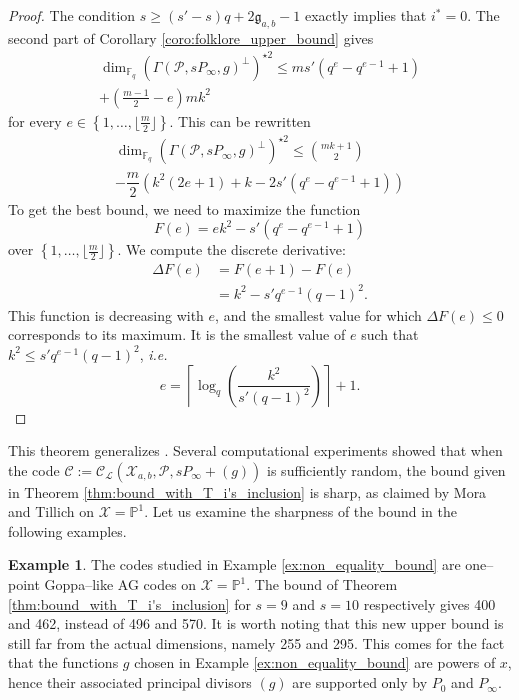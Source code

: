 \documentclass[journal]{IEEEtran}
\theoremstyle{plain}
\theoremstyle{definition}
\newtheorem{example}[thm]{Example}
\theoremstyle{remark}
\newcommand{\calP}{\mathcal{P}}
\newcommand{\calL}{\mathcal{L}}
\newcommand{\calC}{\mathcal{C}}
\newcommand{\calX}{\mathcal{X}}
\newcommand{\fq}{\mathbb{F}_{q}}
\newcommand{\PP}{\mathbb{P}}
\newcommand{\set}[1]{\left\{#1\right\}}
\begin{document}
	\begin{proof}
		The condition $s \geq (s'-s)q+2\mathfrak{g}_{a,b}-1$ exactly implies that $i^*=0$. The second part of Corollary \ref{coro:folklore_upper_bound} gives
		\begin{multline*}
				\dim_{\fq} (\Gamma(\calP,sP_\infty,g)^{\perp})^{\star 2} \leq ms'(q^e-q^{e-1}+1) \\+ \left( \frac{m-1}{2} -e \right)mk^2
		\end{multline*}
	for every $e \in \set{1,\dots,\lfloor \frac{m}{2} \rfloor}$. This can be rewritten 
			\begin{multline*}
		\dim_{\fq} (\Gamma(\calP,sP_\infty,g)^{\perp})^{\star 2} \leq \binom{mk+1}{2} \\- \dfrac{m}{2}\left(k^2(2e+1)+k-2s'(q^e-q^{e-1}+1)\right)
	\end{multline*} 
		To get the best bound, we need to maximize the function
		$$F(e) = ek^2-s'(q^e-q^{e-1}+1)$$
		over $\set{1,\dots,\lfloor \frac{m}{2} \rfloor}$.
		We compute the discrete derivative:
		\begin{align*}
			\Delta F(e) &= F(e+1)-F(e) \\
			&= k^2 - s'q^{e-1}(q-1)^2.
		\end{align*}
		This function is decreasing with $e$, and the smallest value for which $\Delta F(e) \leq 0$ corresponds to its maximum. It is the smallest value of $e$ such that $k^2 \leq s'q^{e-1}(q-1)^2$, \emph{i.e.}
		$$e =  \left\lceil \log_q\left(\dfrac{k^2}{s'(q-1)^2}\right)\right\rceil+1.$$
	\end{proof}
	
	This theorem generalizes \cite[Corollary 27]{MT21}. Several computational experiments showed that when the code $\calC:=\calC_{\calL}(\calX_{a,b},\calP,sP_\infty+(g))$ is sufficiently random, the bound given in Theorem \ref{thm:bound_with_T_i's_inclusion} is sharp, as claimed by Mora and Tillich \cite[Remark 28]{MT21} on ${\calX=\PP^1}$. Let us examine the sharpness of the bound in the following examples.
	
	\begin{example}\label{ex:comp}
		The codes studied in Example \ref{ex:non_equality_bound} are one--point Goppa--like AG codes on ${\calX=\PP^1}$. The bound of Theorem \ref{thm:bound_with_T_i's_inclusion} for $s=9$ and $s=10$ respectively gives 400 and 462, instead of 496 and 570. It is worth noting that this new upper bound is still far from the actual dimensions, namely 255 and 295. This comes for the fact that the functions $g$ chosen in Example \ref{ex:non_equality_bound} are powers of $x$, hence their associated principal divisors $(g)$ are supported only by $P_0$ and $P_\infty$.
	\end{example}
	
\end{document}
